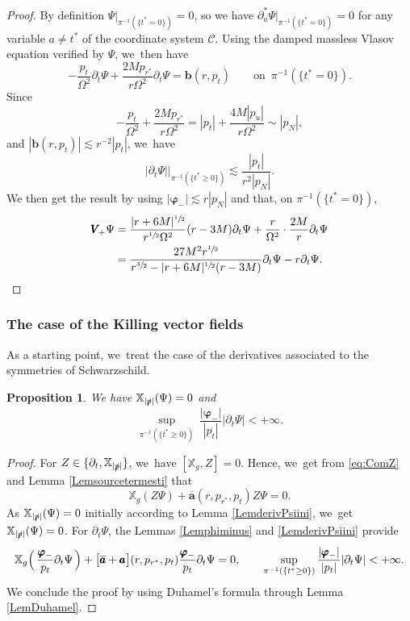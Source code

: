 \documentclass[10pt]{amsart}
\theoremstyle{plain}
\newtheorem{proposition}{Proposition}[section]
\theoremstyle{definition}
\newcommand\T{{\mathbb{X}}}
\begin{document}
\begin{proof}
By definition $\Psi \vert_{\pi^{-1}(\{t^*=0 \})}=0$, so we have $\partial^*_a\Psi \vert_{\pi^{-1}(\{t^*=0 \})}=0$ for any variable $a \neq t^*$ of the coordinate system $\mathscr{C}$. Using the damped massless Vlasov equation verified by $\Psi$, we~then have
\[
-\frac{p_t}{\Omega^2} \partial_t \Psi+\frac{2Mp_{r^*}}{r\Omega^2} \partial_t \Psi = \pmb{b}(r,p_t) \qquad \text{on $\,\pi^{-1}(\{t^*=0 \})$}.
\]
Since
\[
-\frac{p_t}{\Omega^2}+\frac{2Mp_{r^*}}{r\Omega^2} = |p_t|+\frac{4M|p_u|}{r\Omega^2} \sim |p_N|,
\]
and $|\pmb{b}(r,p_t)| \lesssim r^{-2} |p_t|$, we~have
\[
| \partial_t \Psi | \Big\vert_{\pi^{-1} (\{t^* \geq 0 \})} \lesssim \frac{|p_t|}{r^2|p_N|}.
\]
We then get the result by using $|\pmb{\varphi}_-| \lesssim r |p_N|$ and that, on $\pi^{-1}(\{t^*=0 \})$,
\begin{align*}
\pmb{V}_{\! +} \Psi &= \frac{|r+6M|^{\sfrac{1}{2}}}{r^{\sfrac{1}{2}}\Omega^2}(r-3M) \partial_t \Psi +\frac{r}{\Omega^2} \cdot \frac{2M}{r} \partial_t \Psi\\
&= \frac{27M^2r^{\sfrac{1}{2}} }{r^{\sfrac{3}{2}}-|r+6M|^{\sfrac{1}{2}}(r-3M)}\partial_t \Psi-r \partial_t \Psi.\qedhere
\end{align*}
\end{proof}

\subsubsection{The case of the Killing vector fields}

As a starting point, we~treat the case of the derivatives associated to the symmetries of Schwarzschild.

\begin{proposition}\label{ProPsiKilling}
We have $\T_{|\slashed{p}|} (\Psi)=0$ and
\[
\sup_{ \pi^{-1} (\{t^* \geq 0 \})} \, \frac{|\pmb{\varphi}_-|}{|p_t|} \big|\partial_t\Psi \big| < +\infty.
\]
\end{proposition}
\begin{proof}
For $Z \in \{\partial_t, \T_{|\slashed{p}|} \}$, we~have $[\T_g,Z]=0$. Hence, we~get from \eqref{eq:ComZ} and Lemma \ref{Lemsourcetermesti} that
\[
\T_g (Z \Psi)+ \overline{\pmb{a}}(r,p_{r^*},p_t) Z \Psi =0.
\]
As $\T_{|\slashed{p}|} (\Psi) =0$ initially according to Lemma \ref{LemderivPsiini}, we~get $\T_{|\slashed{p}|} (\Psi)=0$. For $\partial_t \Psi$, the Lemmas \ref{Lemphiminus} and \ref{LemderivPsiini} provide
\[
\T_g \Bigl(\, \frac{\pmb{\varphi}_-}{p_t} \partial_t \Psi \, \Bigr)+ \bigl[\overline{\pmb{a}}+\pmb{a} \bigr](r,p_{r^*},p_t) \frac{\pmb{\varphi}_-}{p_t} \partial_t \Psi =0,\qquad \sup_{\pi^{-1} (\{t^* \geq 0 \}) } \frac{|\pmb{\varphi}_-|}{|p_t|}| \partial_t \Psi | < + \infty.
\]
We conclude the proof by using Duhamel's formula through Lemma \ref{LemDuhamel}.
\end{proof}
\end{document}
